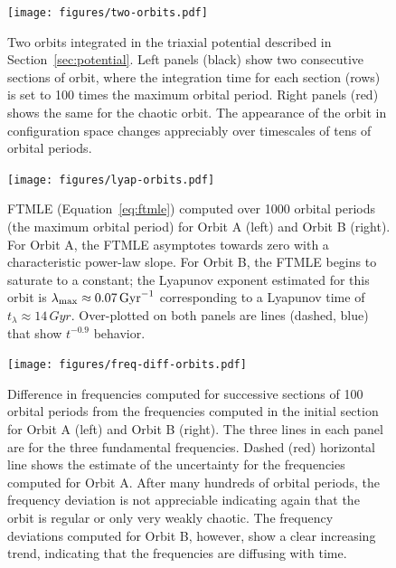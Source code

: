 \documentclass[letterpaper,12pt,preprint]{aastex}
\begin{document}
\begin{figure}[!p]
\begin{center}
\texttt{[image: figures/two-orbits.pdf]}
\caption{ Two orbits integrated in the triaxial potential described in Section~\ref{sec:potential}. Left panels (black) show two consecutive sections of orbit, where the integration time for each section (rows) is set to 100 times the maximum orbital period. Right panels (red) shows the same for the chaotic orbit. The appearance of the orbit in configuration space changes appreciably over timescales of tens of orbital periods. } \label{fig:two-orbits}
\end{center}
\end{figure}

\begin{figure}[p]
\begin{center}
\texttt{[image: figures/lyap-orbits.pdf]}
\caption{ FTMLE (Equation~\ref{eq:ftmle}) computed over 1000 orbital periods (the maximum orbital period) for Orbit A (left) and Orbit B (right). For Orbit A, the FTMLE asymptotes towards zero with a characteristic power-law slope. For Orbit B, the FTMLE begins to saturate to a constant; the Lyapunov exponent estimated for this orbit is $\lambda_{\rm max} \approx 0.07 \, {\rm Gyr}^{-1}$ corresponding to a Lyapunov time of $t_\lambda \approx 14 \, {Gyr}$. Over-plotted on both panels are lines (dashed, blue) that show $t^{-0.9}$ behavior.} \label{fig:lyap-orbits}
\end{center}
\end{figure}

\begin{figure}[p]
\begin{center}
\texttt{[image: figures/freq-diff-orbits.pdf]}
\caption{ Difference in frequencies computed for successive sections of 100 orbital periods from the frequencies computed in the initial section for Orbit A (left) and Orbit B (right). The three lines in each panel are for the three fundamental frequencies. Dashed (red) horizontal line shows the estimate of the uncertainty for the frequencies computed for Orbit A. After many hundreds of orbital periods, the frequency deviation is not appreciable indicating again that the orbit is regular or only very weakly chaotic. The frequency deviations computed for Orbit B, however, show a clear increasing trend, indicating that the frequencies are diffusing with time. } \label{fig:fdiff-orbits} %
\end{center}
\end{figure}
\end{document}
